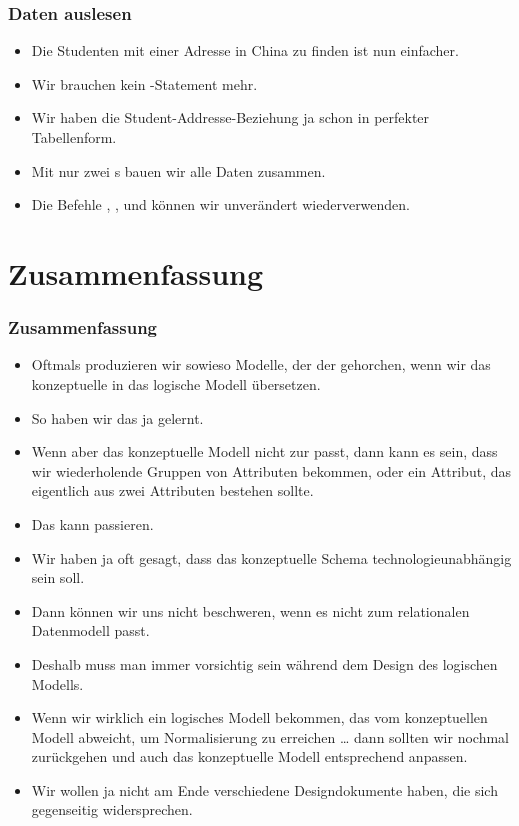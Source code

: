 \documentclass[aspectratio=169,mathserif,notheorems]{beamer}%
\begin{document}
%
\begin{frame}[t]%
\frametitle{Daten auslesen}%
\parbox{0.435\linewidth}{\small%
\begin{itemize}%
%
\item Die Studenten mit einer Adresse in China zu finden ist nun einfacher.%
%
\item<2-> Wir brauchen kein -Statement mehr.%
%
\item<3-> Wir haben die Student-Addresse-Beziehung ja schon in perfekter Tabellenform.%
%
\item<4-> Mit nur zwei s bauen wir alle Daten zusammen.%
%
\item<5-> Die Befehle , ,  und  können wir unverändert wiederverwenden.%
%
\end{itemize}%
}%
%
%
%
\end{frame}%
%
\section{Zusammenfassung}%
%
\begin{frame}%
\frametitle{Zusammenfassung}%
\begin{itemize}%
%
%
\item<2-> Oftmals produzieren wir sowieso Modelle, der der  gehorchen, wenn wir das konzeptuelle in das logische Modell übersetzen.%
%
\item<3-> So haben wir das ja gelernt.%
%
\item<4-> Wenn aber das konzeptuelle Modell nicht zur  passt, dann kann es sein, dass wir wiederholende Gruppen von Attributen bekommen, oder ein Attribut, das eigentlich aus zwei Attributen bestehen sollte.%
%
\item<5-> Das kann passieren.%
%
\item<6-> Wir haben ja oft gesagt, dass das konzeptuelle Schema technologieunabhängig sein soll.%
%
\item<7-> Dann können wir uns nicht beschweren, wenn es nicht zum relationalen Datenmodell passt.%
%
\item<8-> Deshalb muss man immer vorsichtig sein während dem Design des logischen Modells.%
%
\item<9-> Wenn wir wirklich ein logisches Modell bekommen, das vom konzeptuellen Modell abweicht, um Normalisierung zu erreichen {\dots} dann sollten wir nochmal zurückgehen und auch das konzeptuelle Modell entsprechend anpassen.%
%
\item<10-> Wir wollen ja nicht am Ende verschiedene Designdokumente haben, die sich gegenseitig widersprechen.%
\end{itemize}%
\end{frame}%
\endPresentation%
\end{document}
